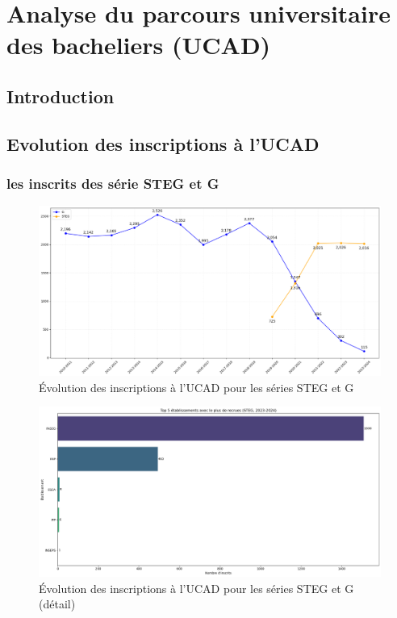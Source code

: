 \chapter{Analyse du parcours universitaire des bacheliers (UCAD)}

\section{Introduction}

\section{Evolution des inscriptions à l'UCAD}

\subsection{les inscrits des série STEG et G}

\begin{figure}[h]
\centering
\caption{Évolution des inscriptions à l'UCAD pour les séries STEG et G}
\includegraphics[width=1\textwidth]{figure/Inscrits_ucad_STEG.png}
\end{figure}

\begin{figure}
\centering
\caption{Évolution des inscriptions à l'UCAD pour les séries STEG et G (détail)}
\includegraphics[width=1\textwidth]{figure/etab_STEG_2024.png}
\end{figure}

